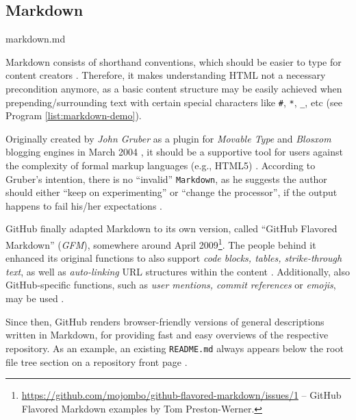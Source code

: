 \subsection{Markdown}
\label{sec:buildpipelines-markdown}

\begin{program}
  \caption{markdown.md}
  \label{list:markdown-demo}

\end{program}

Markdown consists of shorthand conventions, which should be easier to type for content creators  \cite[38]{dhillon2016}.
Therefore, it makes understanding HTML not a necessary precondition anymore, as a basic content structure may be easily achieved when prepending/surrounding text with certain special characters like \texttt{\#}, \texttt{*}, \texttt{\_}, etc (see Program \ref{list:markdown-demo}).

Originally created by \emph{John Gruber} as a plugin for \emph{Movable Type} and \emph{Blosxom} blogging engines in March 2004 \cite{Markdown2004introduction}\cite{Markdown2004main}, it should be a supportive tool for users against the complexity of formal markup languages (e.g., HTML5) \cite[4]{RFC7764}. According to Gruber's intention, there is no ``invalid'' \texttt{Markdown}, as he suggests the author should either ``keep on experimenting'' or ``change the processor'', if the output happens to fail his/her expectations \cite[5]{RFC7764}.

GitHub finally adapted Markdown to its own version, called ``GitHub Flavored Markdown'' (\emph{GFM}), somewhere around April 2009\footnote{\url{https://github.com/mojombo/github-flavored-markdown/issues/1} -- GitHub Flavored Markdown examples by Tom Preston-Werner.}. The people behind it enhanced its original functions to also support \emph{code blocks, tables, strike-through text}, as well as \emph{auto-linking} URL structures within the content \cite[18]{RFC7764}. Additionally, also GitHub-specific functions, such as \emph{user mentions, commit references} or \emph{emojis}, may be used \cite{GithubFlavoredMarkdown}.

Since then, GitHub renders browser-friendly versions of general descriptions written in Markdown, for providing fast and easy overviews of the respective repository. As an example, an existing \texttt{README.md} always appears below the root file tree section on a repository front page \cite[5]{gandrud2013github}.
